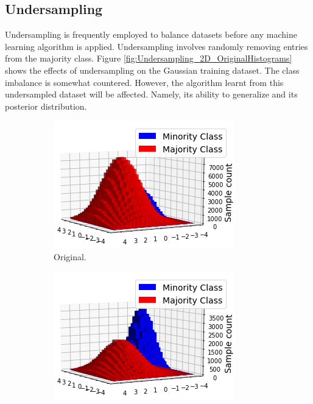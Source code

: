 \documentclass[conference]{IEEEtran}
\begin{document}
	\subsection{Undersampling}
		Undersampling is frequently employed to balance datasets before any machine learning algorithm is applied. Undersampling involves randomly removing entries from the majority class. Figure \ref{fig:Undersampling_2D_OriginalHistograms} shows the effects of undersampling on the Gaussian training dataset. The class imbalance is somewhat countered. However, the algorithm learnt from this undersampled dataset will be affected. Namely, its ability to generalize and its posterior distribution.
			\begin{figure}[h]
			     \centering
			     \begin{subfigure}[b]{0.24\textwidth}
			         \centering
			         \includegraphics[width=\textwidth]{Undersampling_2D_OriginalDataset}
			         \caption{Original.}
			         \label{fig:Undersampling_2D_OriginalDataset}
			     \end{subfigure}
			     \hfill
			     \begin{subfigure}[b]{0.24\textwidth}
			         \centering
			         \includegraphics[width=\textwidth]{Undersampling_2D_UndersampledDataset}

\end{subfigure}
\end{figure}
\end{document}
